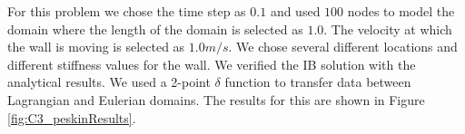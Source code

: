 For this problem we chose the time step as $0.1$ and used $100$ nodes to model the domain where the length of the domain is selected as $1.0$. The velocity at which the wall is moving is selected as $1.0 m/s$. We chose several different locations and different stiffness values for the wall. We verified the IB solution with the analytical results. We used a 2-point $\delta$ function to transfer data between Lagrangian and Eulerian domains. The results for this are shown in Figure \ref{fig:C3_peskinResults}.

\begin{figure}[h]
	\centering
	\quad
	\\
	\quad
\end{figure}
